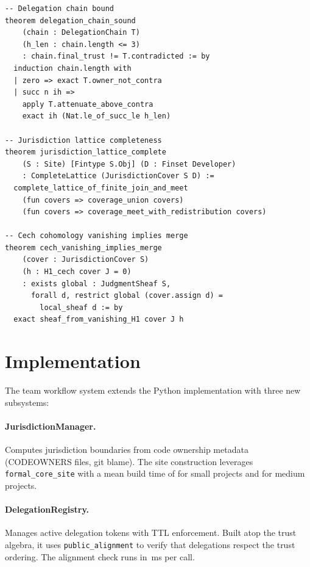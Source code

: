 \documentclass[11pt]{article}
\begin{document}
\begin{lstlisting}
-- Delegation chain bound
theorem delegation_chain_sound
    (chain : DelegationChain T)
    (h_len : chain.length <= 3)
    : chain.final_trust != T.contradicted := by
  induction chain.length with
  | zero => exact T.owner_not_contra
  | succ n ih =>
    apply T.attenuate_above_contra
    exact ih (Nat.le_of_succ_le h_len)

-- Jurisdiction lattice completeness
theorem jurisdiction_lattice_complete
    (S : Site) [Fintype S.Obj] (D : Finset Developer)
    : CompleteLattice (JurisdictionCover S D) :=
  complete_lattice_of_finite_join_and_meet
    (fun covers => coverage_union covers)
    (fun covers => coverage_meet_with_redistribution covers)

-- Cech cohomology vanishing implies merge
theorem cech_vanishing_implies_merge
    (cover : JurisdictionCover S)
    (h : H1_cech cover J = 0)
    : exists global : JudgmentSheaf S,
      forall d, restrict global (cover.assign d) =
        local_sheaf d := by
  exact sheaf_from_vanishing_H1 cover J h
\end{lstlisting}

\section{Implementation}\label{sec:implementation}

The team workflow system extends the \JuGeo{} Python implementation with three
new subsystems:

\paragraph{JurisdictionManager.}
Computes jurisdiction boundaries from code ownership metadata (CODEOWNERS files,
git blame). The site construction leverages \texttt{formal\_core\_site} with a
mean build time of \subFormalcoresiteSmallTime{} for small projects and
\subFormalcoresiteMediumTime{} for medium projects.

\paragraph{DelegationRegistry.}
Manages active delegation tokens with TTL enforcement. Built atop the trust
algebra, it uses \texttt{public\_alignment} to verify that delegations respect
the trust ordering. The alignment check runs in
\compProfPublicAlignmentMeanMs{}\,ms per call.
\end{document}
